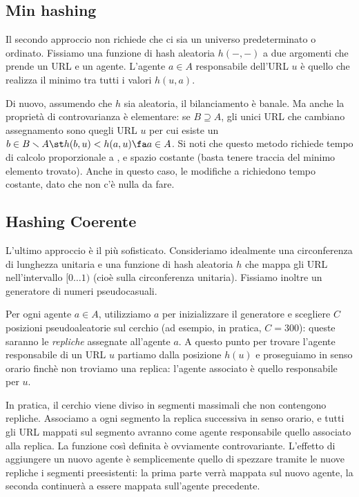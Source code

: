 \subsection{Min hashing}
Il secondo approccio non richiede che ci sia un universo predeterminato o ordinato. Fissiamo una funzione di hash aleatoria $h(-, -)$ a due argomenti che prende un URL e un agente. L'agente $a \in A$ responsabile dell'URL $u$ è quello che realizza il minimo tra tutti i valori $h(u, a)$.

Di nuovo, assumendo che $h$ sia aleatoria, il bilanciamento è banale. Ma anche la proprietà di controvarianza è elementare: se $B \supseteq A$, gli unici URL che cambiano assegnamento sono quegli URL $u$ per cui esiste un $b \in B \smallsetminus A \st h(b, u) < h(a, u) \fa a \in A$.
Si noti che questo metodo richiede tempo di calcolo proporzionale a , e spazio costante (basta tenere traccia del minimo elemento trovato). Anche in questo caso, le modifiche a  richiedono tempo costante, dato che non c'è nulla da fare.
\subsection{Hashing Coerente}
L'ultimo approccio è il più sofisticato. Consideriamo idealmente una circonferenza di lunghezza unitaria e una funzione di hash aleatoria $h$ che mappa gli URL nell'intervallo $[0\dots1)$ (cioè sulla circonferenza unitaria). Fissiamo inoltre un generatore di numeri pseudocasuali.

Per ogni agente $a \in A$, utilizziamo $a$ per inizializzare il generatore e scegliere $C$ posizioni pseudoaleatorie sul cerchio (ad esempio, in pratica, $C = 300$): queste saranno le \textit{repliche} assegnate all'agente $a$. A questo punto per trovare l'agente responsabile di un URL $u$ partiamo dalla posizione $h(u)$ e proseguiamo in senso orario finchè non troviamo una replica: l'agente associato è quello responsabile per $u$.

In pratica, il cerchio viene diviso in segmenti massimali che non contengono repliche. Associamo a ogni segmento la replica successiva in senso orario, e tutti gli URL mappati sul segmento avranno come agente responsabile quello associato alla replica. La funzione così definita è ovviamente controvariante. L'effetto di aggiungere un nuovo agente è semplicemente quello di spezzare tramite le nuove repliche i segmenti preesistenti: la prima parte verrà mappata sul nuovo agente, la seconda continuerà a essere mappata sull'agente precedente.

